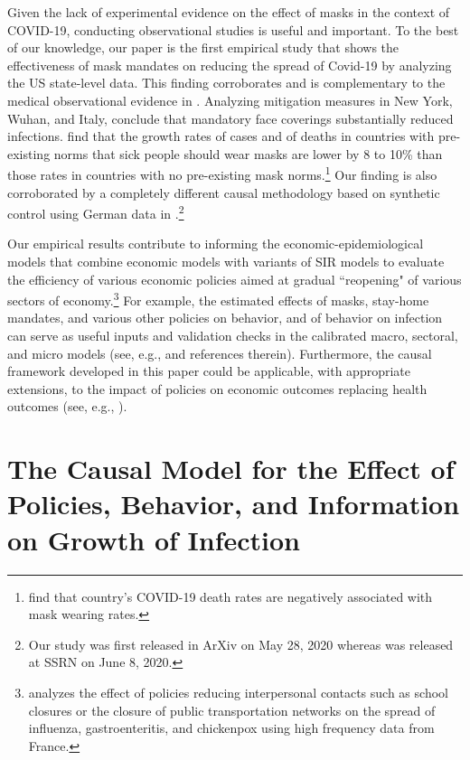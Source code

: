 \documentclass[11pt,reqno,letter]{amsart}
\theoremstyle{definition}
\begin{document}
Given the lack of experimental evidence on the effect of masks in the context of COVID-19, conducting observational studies  is useful and important. To the best of our knowledge, our paper is the first  empirical study that shows the effectiveness of  mask mandates on reducing the spread of Covid-19 by analyzing the US state-level data. This finding corroborates and is complementary to the medical observational evidence in \cite{howard2020}. Analyzing mitigation measures in New York, Wuhan, and Italy, \cite{zhangr2020} conclude that mandatory face coverings substantially reduced infections. \cite{abaluck2020}  find that the growth rates of cases and of deaths in countries with pre-existing norms that sick people should wear masks are lower by 8 to 10\% than those rates in countries with no pre-existing mask norms.\footnote{\cite{miyazawa2020} find that  country's COVID-19 death rates are negatively associated with mask wearing rates.} Our finding is also corroborated by a completely different causal methodology based on synthetic control
using German data in \cite{Mitze2020}.\footnote{Our study was first released in ArXiv on May 28, 2020 whereas
 \cite{Mitze2020} was released at SSRN on June 8, 2020.}

Our empirical results contribute to informing the economic-epidemiological models that combine economic models with variants of SIR models to evaluate the efficiency of various economic policies aimed at gradual ``reopening" of various sectors of economy.\footnote{\cite{adda2016} analyzes the effect of policies reducing interpersonal contacts such as school closures or the closure of public transportation networks on the spread of  influenza, gastroenteritis, and chickenpox using high frequency data from France.} For example, the estimated effects of masks, stay-home mandates, and various other policies on behavior, and of behavior on infection can serve as useful inputs and validation checks in the calibrated macro, sectoral, and micro models (see, e.g., \cite{alvarez2020simple,baqaee2020reopening,NBERw27128,acemoglu2020multi,lsmith,nashSIR} and references therein). Furthermore, the causal framework developed in this paper could be applicable, with appropriate extensions, to the impact of policies on economic outcomes replacing health outcomes (see, e.g., \cite{chetty2020real,coibion2020labor}).



\section{The Causal Model for the Effect of Policies, Behavior, and Information on Growth of Infection}\label{sec:causal-model}
\end{document}

